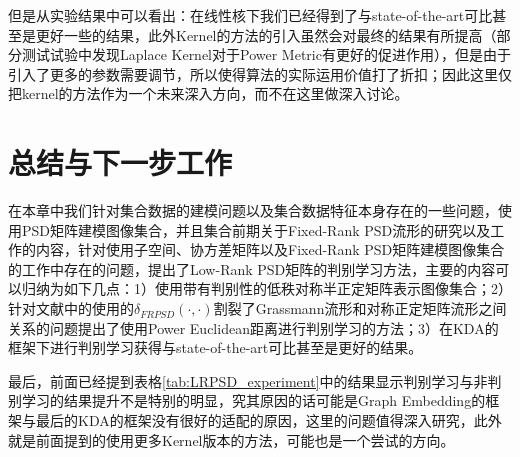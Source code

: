 但是从实验结果中可以看出：在线性核下我们已经得到了与state-of-the-art可比甚至是更好一些的结果，此外Kernel的方法的引入虽然会对最终的结果有所提高（部分测试试验中发现Laplace Kernel对于Power Metric有更好的促进作用），但是由于引入了更多的参数需要调节，所以使得算法的实际运用价值打了折扣；因此这里仅把kernel的方法作为一个未来深入方向，而不在这里做深入讨论。
\section{总结与下一步工作}
在本章中我们针对集合数据的建模问题以及集合数据特征本身存在的一些问题，使用PSD矩阵建模图像集合，并且集合前期关于Fixed-Rank PSD流形的研究以及工作\cite{PSD_WACV}的内容，针对使用子空间、协方差矩阵以及Fixed-Rank PSD矩阵建模图像集合的工作\cite{PSD_WACV}中存在的问题，提出了Low-Rank PSD矩阵的判别学习方法，主要的内容可以归纳为如下几点：1）使用带有判别性的低秩对称半正定矩阵表示图像集合；2）针对文献\cite{PSD_WACV}中的使用的$\delta_{FRPSD}(\cdot,\cdot)$割裂了Grassmann流形和对称正定矩阵流形之间关系的问题提出了使用Power Euclidean距离进行判别学习的方法；3）在KDA\cite{Kernel_KDA}的框架下进行判别学习获得与state-of-the-art可比甚至是更好的结果。

最后，前面已经提到表格\ref{tab:LRPSD_experiment}中的结果显示判别学习与非判别学习的结果提升不是特别的明显，究其原因的话可能是Graph Embedding的框架与最后的KDA的框架没有很好的适配的原因，这里的问题值得深入研究，此外就是前面提到的使用更多Kernel版本的方法，可能也是一个尝试的方向。